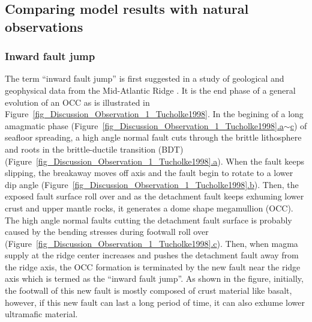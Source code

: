 \subsection{Comparing model results with natural observations}


\subsubsection{Inward fault jump}

The term ``inward fault jump'' is first suggested in a study of geological and geophysical data from the Mid-Atlantic Ridge \citep{Tucholke1998}. It is the end phase of a general evolution of an OCC as is illustrated in Figure~\hyperref[fig_Discussion_Observation_1_Tucholke1998]{\ref{fig_Discussion_Observation_1_Tucholke1998}}. In the begining of a long amagmatic phase (Figure~\hyperref[fig_Discussion_Observation_1_Tucholke1998]{\ref{fig_Discussion_Observation_1_Tucholke1998}.a$\sim$c}) of seafloor spreading, a high angle normal fault cuts through the brittle lithosphere and roots in the brittle-ductile transition (BDT) (Figure~\hyperref[fig_Discussion_Observation_1_Tucholke1998]{\ref{fig_Discussion_Observation_1_Tucholke1998}.a}). When the fault keeps slipping, the breakaway moves off axis and the fault begin to rotate to a lower dip angle (Figure~\hyperref[fig_Discussion_Observation_1_Tucholke1998]{\ref{fig_Discussion_Observation_1_Tucholke1998}.b}). Then, the exposed fault surface roll over and as the detachment fault keeps exhuming lower crust and upper mantle rocks, it generates a dome shape megamullion (OCC). The high angle normal faults cutting the detachment fault surface is probably caused by the bending stresses during footwall roll over (Figure~\hyperref[fig_Discussion_Observation_1_Tucholke1998]{\ref{fig_Discussion_Observation_1_Tucholke1998}.c}). Then, when magma supply at the ridge center increases and pushes the detachment fault away from the ridge axis, the OCC formation is terminated by the new fault near the ridge axis which is termed as the ``inward fault jump''. As shown in the figure, initially, the footwall of this new fault is mostly composed of crust material like basalt, however, if this new fault can last a long period of time, it can also exhume lower ultramafic material.


